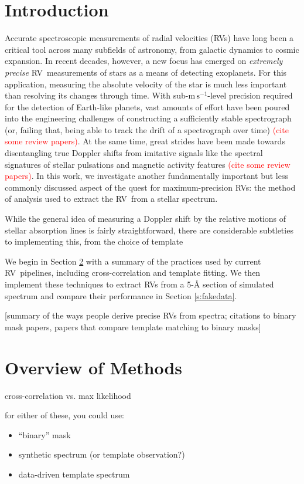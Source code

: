 \documentclass[modern]{aastex61}
\newcommand{\unit}[1]{\mathrm{#1}}
\newcommand{\m}{\unit{m}}
\newcommand{\s}{\unit{s}}
\newcommand{\ms}{\m\,\s^{-1}}
\newcommand\todo[1]{\textcolor{red}{#1}}  %
\newcommand{\acronym}[1]{{\small{#1}}}
\newcommand{\RV}{\acronym{RV}}
\begin{document}
\section{Introduction}

Accurate spectroscopic measurements of radial velocities (\RV s) have long been a critical tool across many subfields of astronomy, from galactic dynamics to cosmic expansion. In recent decades, however, a new focus has emerged on \textit{extremely precise} \RV\ measurements of stars as a means of detecting exoplanets. For this application, measuring the absolute velocity of the star is much less important than resolving its changes through time. With sub-$\ms$-level precision required for the detection of Earth-like planets, vast amounts of effort have been poured into the engineering challenges of constructing a sufficiently stable spectrograph (or, failing that, being able to track the drift of a spectrograph over time) \todo{(cite some review papers)}. At the same time, great strides have been made towards disentangling true Doppler shifts from imitative signals like the spectral signatures of stellar pulsations and magnetic activity features \todo{(cite some review papers)}.  In this work, we investigate another fundamentally important but less commonly discussed aspect of the quest for maximum-precision \RV s: the method of analysis used to extract the \RV\ from a stellar spectrum.

While the general idea of measuring a Doppler shift by the relative motions of stellar absorption lines is fairly straightforward, there are considerable subtleties to implementing this, from the choice of template 

We begin in Section \ref{s:methods} with a summary of the practices used by current \RV\ pipelines, including cross-correlation and template fitting. We then implement these techniques to extract \RV s from a 5-\r{A} section of simulated spectrum and compare their performance in Section \ref{s:fakedata}. 

[summary of the ways people derive precise \RV s from spectra; citations to binary mask papers, papers that compare template matching to binary masks]

\section{Overview of Methods}
\label{s:methods}

cross-correlation vs. max likelihood

for either of these, you could use:
\begin{itemize}
\item ``binary'' mask
\item synthetic spectrum (or template observation?)
\item data-driven template spectrum
\end{itemize}
\end{document}
